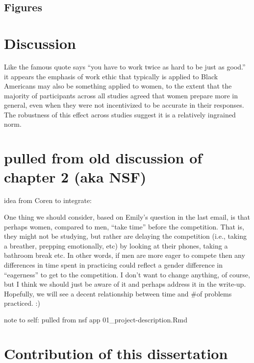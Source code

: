 \documentclass[a4paper, nobind]{templates/ociamthesis}
\begin{document}
\hypertarget{figures-1}{%
\section{Figures}\label{figures-1}}

\hypertarget{discussion-4}{%
\chapter*{Discussion}\label{discussion-4}}

\adjustmtc
{}

Like the famous quote says ``you have to work twice as hard to be just as good.'' it appears the emphasis of work ethic that typically is applied to Black Americans may also be something applied to women, to the extent that the majority of participants across all studies agreed that women prepare more in general, even when they were not incentivized to be accurate in their responses. The robustness of this effect across studies suggest it is a relatively ingrained norm.

\hypertarget{pulled-from-old-discussion-of-chapter-2-aka-nsf}{%
\chapter{pulled from old discussion of chapter 2 (aka NSF)}\label{pulled-from-old-discussion-of-chapter-2-aka-nsf}}

idea from Coren to integrate:

One thing we should consider, based on Emily's question in the last email, is that perhaps women, compared to men, ``take time'' before the competition. That is, they might not be studying, but rather are delaying the competition (i.e., taking a breather, prepping emotionally, etc) by looking at their phones, taking a bathroom break etc. In other words, if men are more eager to compete then any differences in time spent in practicing could reflect a gender difference in ``eagerness'' to get to the competition. I don't want to change anything, of course, but I think we should just be aware of it and perhaps address it in the write-up. Hopefully, we will see a decent relationship between time and \#of problems practiced. :)

note to self: pulled from nsf app 01\_project-description.Rmd

\hypertarget{contribution-of-this-dissertation}{%
\chapter{Contribution of this dissertation}\label{contribution-of-this-dissertation}}
\end{document}
